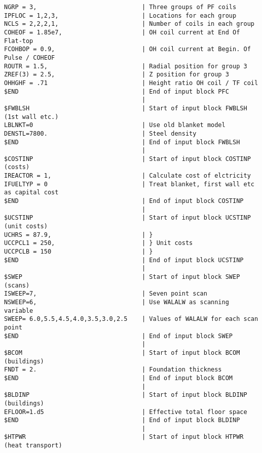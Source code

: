 \documentclass[11pt,a4paper]{report}
\begin{document}
\begin{verbatim}
NGRP = 3,                             | Three groups of PF coils
IPFLOC = 1,2,3,                       | Locations for each group
NCLS = 2,2,2,1,                       | Number of coils in each group
COHEOF = 1.85e7,                      | OH coil current at End Of Flat-top
FCOHBOP = 0.9,                        | OH coil current at Begin. Of Pulse / COHEOF
ROUTR = 1.5,                          | Radial position for group 3
ZREF(3) = 2.5,                        | Z position for group 3
OHHGHF = .71                          | Height ratio OH coil / TF coil
$END                                  | End of input block PFC
                                      | 
$FWBLSH                               | Start of input block FWBLSH (1st wall etc.)
LBLNKT=0                              | Use old blanket model
DENSTL=7800.                          | Steel density
$END                                  | End of input block FWBLSH
                                      | 
$COSTINP                              | Start of input block COSTINP (costs)
IREACTOR = 1,                         | Calculate cost of elctricity
IFUELTYP = 0                          | Treat blanket, first wall etc as capital cost
$END                                  | End of input block COSTINP
                                      | 
$UCSTINP                              | Start of input block UCSTINP (unit costs)
UCHRS = 87.9,                         | }
UCCPCL1 = 250,                        | } Unit costs
UCCPCLB = 150                         | }
$END                                  | End of input block UCSTINP
                                      | 
$SWEP                                 | Start of input block SWEP (scans)
ISWEEP=7,                             | Seven point scan
NSWEEP=6,                             | Use WALALW as scanning variable
SWEEP= 6.0,5.5,4.5,4.0,3.5,3.0,2.5    | Values of WALALW for each scan point
$END                                  | End of input block SWEP
                                      | 
$BCOM                                 | Start of input block BCOM (buildings)
FNDT = 2.                             | Foundation thickness
$END                                  | End of input block BCOM
                                      | 
$BLDINP                               | Start of input block BLDINP (buildings)
EFLOOR=1.d5                           | Effective total floor space
$END                                  | End of input block BLDINP
                                      | 
$HTPWR                                | Start of input block HTPWR (heat transport)

\end{verbatim}
\end{document}
